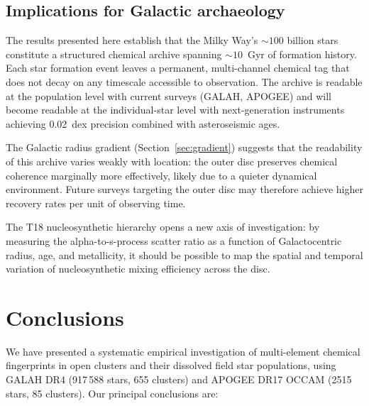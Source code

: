 \documentclass[fleqn,usenatbib]{mnras}
\begin{document}
\subsection{Implications for Galactic archaeology}

The results presented here establish that the Milky Way's ${\sim}100$ billion stars constitute a structured chemical archive spanning ${\sim}10$~Gyr of formation history.
Each star formation event leaves a permanent, multi-channel chemical tag that does not decay on any timescale accessible to observation.
The archive is readable at the population level with current surveys (GALAH, APOGEE) and will become readable at the individual-star level with next-generation instruments achieving 0.02~dex precision combined with asteroseismic ages.

The Galactic radius gradient (Section~\ref{sec:gradient}) suggests that the readability of this archive varies weakly with location: the outer disc preserves chemical coherence marginally more effectively, likely due to a quieter dynamical environment.
Future surveys targeting the outer disc may therefore achieve higher recovery rates per unit of observing time.

The T18 nucleosynthetic hierarchy opens a new axis of investigation: by measuring the alpha-to-s-process scatter ratio as a function of Galactocentric radius, age, and metallicity, it should be possible to map the spatial and temporal variation of nucleosynthetic mixing efficiency across the disc.


\section{Conclusions}
\label{sec:conclusions}

We have presented a systematic empirical investigation of multi-element chemical fingerprints in open clusters and their dissolved field star populations, using GALAH DR4 (917\,588 stars, 655 clusters) and APOGEE DR17 OCCAM (2515 stars, 85 clusters).
Our principal conclusions are:
\end{document}
